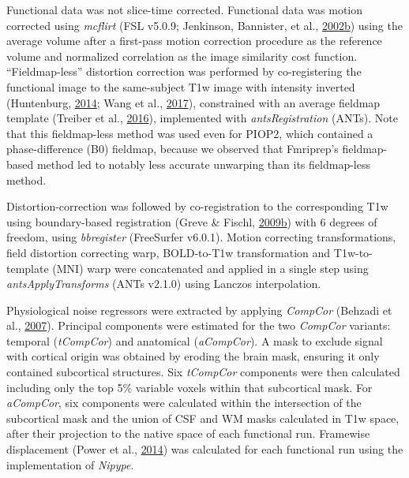 \documentclass[11pt,american,]{memoir} %
\begin{document}
Functional data was not slice-time corrected. Functional data was motion corrected using \emph{mcflirt} (FSL v5.0.9; Jenkinson, Bannister, et al., \protect\hyperlink{ref-Jenkinson2002-wm}{2002}\protect\hyperlink{ref-Jenkinson2002-wm}{b}) using the average volume after a first-pass motion correction procedure as the reference volume and normalized correlation as the image similarity cost function. ``Fieldmap-less'' distortion correction was performed by co-registering the functional image to the same-subject T1w image with intensity inverted (Huntenburg, \protect\hyperlink{ref-Huntenburg2014-ps}{2014}; Wang et al., \protect\hyperlink{ref-Wang2017-nk}{2017}), constrained with an average fieldmap template (Treiber et al., \protect\hyperlink{ref-Treiber2016-mc}{2016}), implemented with \emph{antsRegistration} (ANTs). Note that this fieldmap-less method was used even for PIOP2, which contained a phase-difference (B0) fieldmap, because we observed that Fmriprep's fieldmap-based method led to notably less accurate unwarping than its fieldmap-less method.

Distortion-correction was followed by co-registration to the corresponding T1w using boundary-based registration (Greve \& Fischl, \protect\hyperlink{ref-Greve2009-da}{2009}\protect\hyperlink{ref-Greve2009-da}{b}) with 6 degrees of freedom, using \emph{bbregister} (FreeSurfer v6.0.1). Motion correcting transformations, field distortion correcting warp, BOLD-to-T1w transformation and T1w-to-template (MNI) warp were concatenated and applied in a single step using \emph{antsApplyTransforms} (ANTs v2.1.0) using Lanczos interpolation.

Physiological noise regressors were extracted by applying \emph{CompCor} (Behzadi et al., \protect\hyperlink{ref-Behzadi2007-eb}{2007}). Principal components were estimated for the two \emph{CompCor} variants: temporal (\emph{tCompCor}) and anatomical (\emph{aCompCor}). A mask to exclude signal with cortical origin was obtained by eroding the brain mask, ensuring it only contained subcortical structures. Six \emph{tCompCor} components were then calculated including only the top 5\% variable voxels within that subcortical mask. For \emph{aCompCor}, six components were calculated within the intersection of the subcortical mask and the union of CSF and WM masks calculated in T1w space, after their projection to the native space of each functional run. Framewise displacement (Power et al., \protect\hyperlink{ref-Power2014-gh}{2014}) was calculated for each functional run using the implementation of \emph{Nipype}.
\end{document}
